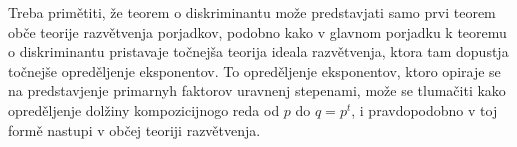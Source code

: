 \documentclass[11pt]{article}
\begin{document}
Treba primětiti, že teorem o diskriminantu može predstavjati samo prvi teorem obče teorije razvětvenja porjadkov, podobno kako v glavnom porjadku k teoremu o diskriminantu pristavaje točnejša teorija ideala razvětvenja, ktora tam dopustja točnejše opreděljenje eksponentov. To opreděljenje eksponentov, ktoro opiraje se na predstavjenje primarnyh faktorov uravnenj stepenami, može se tlumačiti kako opreděljenje dolžiny kompozicijnogo reda od $p$ do $q=p^t$, i pravdopodobno v toj formě nastupi v občej teoriji razvětvenja.
\end{document}

